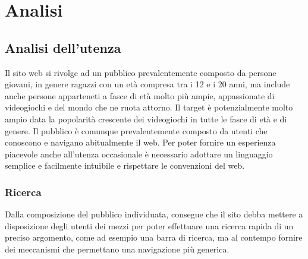 \section{Analisi}

\subsection{Analisi dell'utenza}
Il sito web si rivolge ad un pubblico prevalentemente composto da persone giovani, in genere ragazzi con un età compresa tra i 12 e i 20 anni,
ma include anche persone apparteneti a fasce di età molto più ampie, appassionate di videogiochi e del mondo che ne ruota attorno.
Il target è potenzialmente molto ampio data la popolarità crescente dei videogiochi in tutte le fasce di età e di genere.
Il pubblico è comunque prevalentemente composto da utenti che conoscono e navigano abitualmente il web. 
Per poter fornire un esperienza piacevole anche all'utenza occasionale è necessario adottare un linguaggio semplice e facilmente intuibile e rispettare le convenzioni del web.

\subsubsection{Ricerca}
Dalla composizione del pubblico individuata, consegue che il sito debba mettere a disposizione degli utenti dei mezzi per poter effettuare una ricerca 
rapida di un preciso argomento, come ad esempio una barra di ricerca, ma al contempo fornire dei meccanismi che permettano una navigazione 
più generica. 
